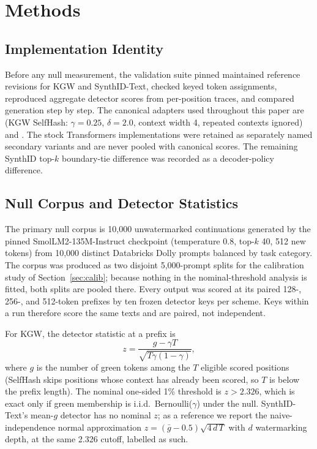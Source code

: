 \documentclass[conference]{IEEEtran}
\begin{document}
\section{Methods}

\subsection{Implementation Identity}

Before any null measurement, the validation suite pinned maintained reference
revisions for KGW and SynthID-Text, checked keyed token assignments, reproduced
aggregate detector scores from per-position traces, and compared generation step by
step. The canonical adapters used throughout this paper are
 (KGW SelfHash: $\gamma=0.25$, $\delta=2.0$, context
width 4, repeated contexts ignored) and . The stock
Transformers implementations were retained as separately named secondary variants
and are never pooled with canonical scores. The remaining SynthID top-$k$
boundary-tie difference was recorded as a decoder-policy difference.

\subsection{Null Corpus and Detector Statistics}

The primary null corpus is 10,000 unwatermarked continuations generated by the
pinned SmolLM2-135M-Instruct checkpoint (temperature 0.8, top-$k$ 40, 512 new
tokens) from 10,000 distinct Databricks Dolly prompts balanced by task category.
The corpus was produced as two disjoint 5,000-prompt splits for the calibration
study of Section~\ref{sec:calib}; because nothing in the nominal-threshold analysis
is fitted, both splits are pooled there. Every output was scored at its paired
128-, 256-, and 512-token prefixes by ten frozen detector keys per scheme. Keys
within a run therefore score the same texts and are paired, not independent.

For KGW, the detector statistic at a prefix is
\begin{equation}
  z = \frac{g - \gamma T}{\sqrt{T\gamma(1-\gamma)}},
  \label{eq:kgwz}
\end{equation}
where $g$ is the number of green tokens among the $T$ eligible scored positions
(SelfHash skips positions whose context has already been scored, so $T$ is below
the prefix length). The nominal one-sided 1\% threshold is $z>2.326$, which is
exact only if green membership is i.i.d.\ Bernoulli($\gamma$) under the null.
SynthID-Text's mean-$g$ detector has no nominal $z$; as a reference we report the
naive-independence normal approximation
$z=(\bar g-0.5)\sqrt{4\,d\,T}$ with $d$ watermarking depth, at the same 2.326
cutoff, labelled as such.
\end{document}
